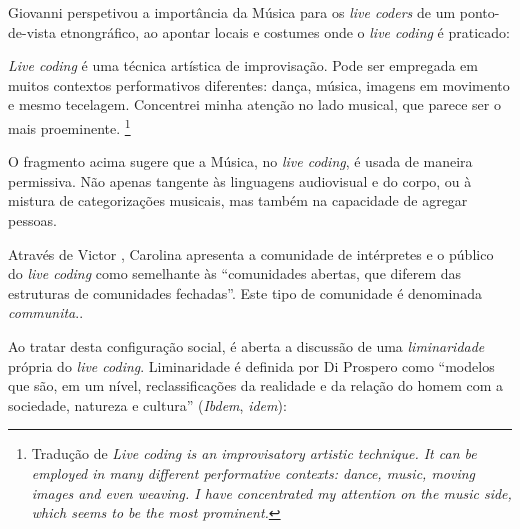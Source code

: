 Giovanni  perspetivou a importância da Música para os \emph{live coders} de um ponto-de-vista etnongráfico, ao apontar locais e costumes onde o \emph{live coding} é praticado:

\begin{citacao}
\emph{Live coding} é uma técnica artística de improvisação. Pode ser empregada em muitos contextos performativos diferentes: dança, música, imagens em movimento e mesmo tecelagem. Concentrei minha atenção no lado musical, que parece ser o mais proeminente. \cite[p.~117]{mori_analysing_2015}\footnote{Tradução de \emph{Live coding is an improvisatory artistic technique. It can be employed in many different performative contexts: dance, music, moving images and even weaving. I have concentrated my attention on the music side, which seems to be the most prominent.}}
\end{citacao}

O fragmento acima sugere que a Música, no \emph{live coding}, é usada de maneira permissiva. Não apenas tangente às linguagens audiovisual e do corpo, ou à mistura de categorizações musicais,  mas também na capacidade de agregar pessoas. 

Através de Victor , Carolina  apresenta a comunidade de intérpretes e o público do \emph{live coding} como semelhante às ``comunidades abertas, que diferem das estruturas de comunidades fechadas''. Este tipo de comunidade é denominada \emph{communita}.. 

Ao tratar desta configuração social, é aberta a discussão de uma \emph{liminaridade} própria do \emph{live coding}. Liminaridade é definida por Di Prospero como ``modelos que são, em um nível, reclassificações da realidade e da relação do homem com a sociedade, natureza e cultura'' (\emph{Ibdem}, \emph{idem}):


